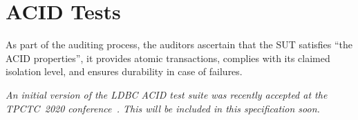 \chapter{ACID Tests}
\label{sec:acid}

As part of the auditing process, the auditors ascertain that the SUT satisfies ``the ACID properties'', \ie it provides atomic transactions, complies with its claimed isolation level, and ensures durability in case of failures.

\emph{An initial version of the LDBC ACID test suite was recently accepted at the TPCTC~2020 conference~\cite{tpctc_acid}. This will be included in this specification soon.}
